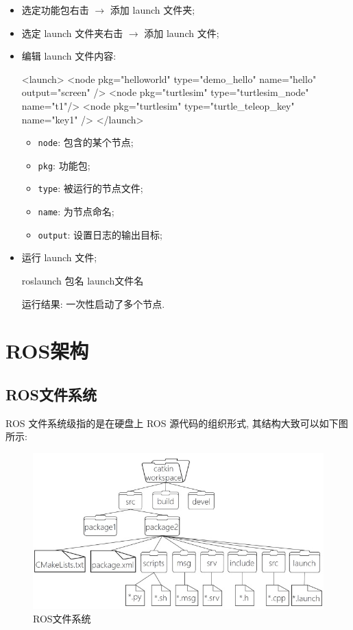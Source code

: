 \documentclass[openany, fontset=windowsold]{ctexbook}
\theoremstyle{kaiti}
\theoremstyle{normal}
\begin{document}
\begin{itemize}
  \item 选定功能包右击 $\rightarrow$ 添加 launch 文件夹;

  \item 选定 launch 文件夹右击 $\rightarrow$ 添加 launch 文件;

  \item 编辑 launch 文件内容:

  \begin{xml}
    <launch>
        <node pkg="helloworld" type="demo_hello" name="hello" output="screen" />
        <node pkg="turtlesim" type="turtlesim_node" name="t1"/>
        <node pkg="turtlesim" type="turtle_teleop_key" name="key1" />
    </launch>
  \end{xml}

  \begin{itemize}
    \item \verb|node|: 包含的某个节点;
    \item \verb|pkg|: 功能包;
    \item \verb|type|: 被运行的节点文件;
    \item \verb|name|: 为节点命名;
    \item \verb|output|: 设置日志的输出目标;
  \end{itemize}

  \item 运行 launch 文件;
  
  \begin{bash}
    roslaunch 包名 launch文件名
  \end{bash}

  运行结果: 一次性启动了多个节点.
\end{itemize}

\section{ROS架构}

\subsection{ROS文件系统}

ROS 文件系统级指的是在硬盘上 ROS 源代码的组织形式, 其结构大致可以如下图所示: 

\begin{figure}[!ht]
  \centering
  \includegraphics[width=.8\textwidth]{ros_file_system.jpg}
  \caption{ROS文件系统}
  \label{fig:ros_file_system}
\end{figure}
\end{document}
